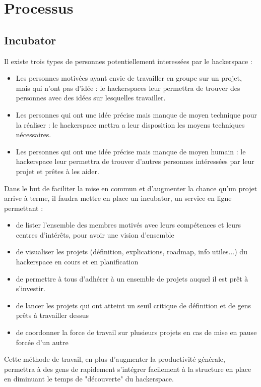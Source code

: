 \documentclass{article}
\begin{document}
\section{Processus}
\subsection{Incubator}

Il existe trois types de personnes potentiellement interessées par le hackerspace :
\begin{itemize}
\item Les personnes motivées ayant envie de travailler en groupe sur un projet, mais qui n'ont pas d'idée : 
le hackerspaces leur permettra de trouver des personnes avec des idées sur lesquelles travailler.
\item Les personnes qui ont une idée précise mais manque de moyen technique pour la réaliser : 
le hackerspace mettra a leur disposition les moyens techniques nécessaires.
\item Les personnes qui ont une idée précise mais manque de moyen humain : 
le hackerspace leur permettra de trouver d'autres personnes intéressées par leur projet et prêtes à les aider.
\end{itemize}

Dans le but de faciliter la mise en commun et d'augmenter la chance qu'un projet 
arrive à terme, il faudra mettre en place un incubator, un service en ligne permettant :
\begin{itemize}
\item de lister l'ensemble des membres motivés avec leurs compétences et leurs 
centres d'intérêts, pour avoir une vision d'ensemble
\item de visualiser les projets (définition, explications, roadmap, info utiles...) 
du hackerspace en cours et en planification
\item de permettre à tous d'adhérer à un ensemble de projets auquel il est prêt à s'investir.
\item de lancer les projets qui ont atteint un seuil critique de définition et 
de gens prêts à travailler dessus
\item de coordonner la force de travail sur plusieurs projets en cas de mise en pause forcée d'un autre
\end{itemize}

Cette méthode de travail, en plus d'augmenter la productivité générale, permettra 
à des gens de rapidement s'intégrer facilement à la structure en place en diminuant 
le temps de "découverte" du hackerspace.
\end{document}
